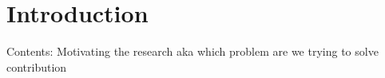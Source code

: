 
\chapter{Introduction}\label{chapter:introduction}

Contents:
  Motivating the research aka which problem are we trying to solve
  contribution

